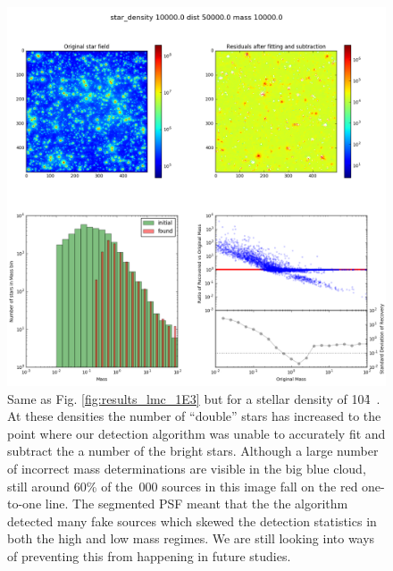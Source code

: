 \begin{appendix}
\begin{figure}

    \centering
    \includegraphics[width=\textwidth]{images/results6_dist=50000_rho=10000}

    \caption{Same as Fig. \ref{fig:results_lmc_1E3} but for a stellar density of 10\h4~\spa. At these densities the number of ``double'' stars has increased to the point where our detection algorithm was unable to accurately fit and subtract the a number of the bright stars. Although a large number of incorrect mass determinations are visible in the big blue cloud, still around 60\% of the \,000 sources in this image fall on the red one-to-one line. The segmented PSF meant that the the algorithm detected many fake sources which skewed the detection statistics in both the high and low mass regimes. We are still looking into ways of preventing this from happening in future studies.}
    
    \label{fig:results_lmc_1E4}
    
\end{figure}

\end{appendix}

